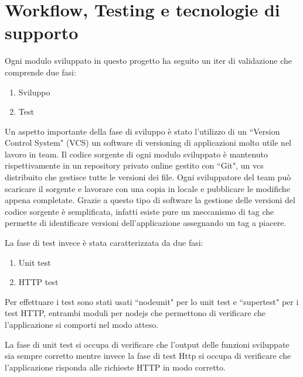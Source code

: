 \chapter{Workflow, Testing e tecnologie di supporto}
Ogni modulo sviluppato in questo progetto ha seguito un iter di validazione che comprende due fasi:
\begin{enumerate}
	\item Sviluppo
	\item Test
\end{enumerate}

Un aspetto importante della fase di sviluppo è stato l'utilizzo di un ``Version Control System" (VCS) un software di versioning di applicazioni molto utile nel lavoro in team. Il codice sorgente di ogni modulo sviluppato è mantenuto rispettivamente in un repository privato online gestito con ``Git", un vcs distribuito che gestisce tutte le versioni dei file. Ogni sviluppatore del team può scaricare il sorgente e lavorare con una copia in locale e pubblicare le modifiche appena completate. Grazie a questo tipo di software la gestione delle versioni del codice sorgente è semplificata, infatti esiste pure un meccanismo di tag che permette di identificare versioni dell'applicazione assegnando un tag a piacere.

La fase di test invece è stata caratterizzata da due fasi:
\begin{enumerate}
	\item Unit test
	\item HTTP test
\end{enumerate}
Per effettuare i test sono stati usati ``nodeunit" per lo unit test e ``supertest" per i test HTTP, entrambi moduli per nodejs che permettono di verificare che l'applicazione si comporti nel modo atteso. 

La fase di unit test si occupa di verificare che l'output delle funzioni sviluppate sia sempre corretto mentre invece la fase di test Http si occupa di verificare che l'applicazione risponda alle richieste HTTP in modo corretto.
